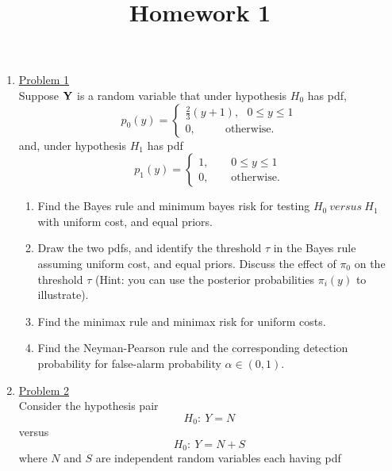 \documentclass[a4paper,english,10pt]{article}
\title{Homework 1}
\begin{document}
\maketitle
\begin{enumerate}
\item \hyperlink{solution1}{Problem 1}\\
Suppose ${\bf Y}$ is a random variable that under hypothesis $H_0$ has pdf,
\begin{equation*}\nonumber
	\nonumber
	p_0(y)=\begin{cases}
		\frac{2}{3}(y+1),~~~0\leq y\leq 1\\
		0,~~~~~~~~~~~~\mbox{otherwise.}
	\end{cases}
\end{equation*}
and, under hypothesis $H_1$ has pdf
\begin{equation*}\nonumber
	\nonumber
	p_1(y)=\begin{cases}
		1,~~~~~~~~~0\leq y\leq 1\\
		0,~~~~~~~~~\mbox{otherwise.}
	\end{cases}
\end{equation*}
\begin{enumerate}[label=(\alph*)]
	\item Find the Bayes rule and minimum bayes risk for testing $H_0~versus~H_1$ with uniform cost, and equal priors.
	\item Draw the two pdfs, and identify the threshold $\tau$ in the Bayes rule assuming uniform cost, and equal priors. Discuss the effect of $\pi_0$ on the threshold $\tau$ (Hint: you can use the posterior probabilities $\pi_i(y)$ to illustrate).	
	\item Find the minimax rule and minimax risk for uniform costs.
	\item Find the Neyman-Pearson rule and the corresponding detection probability for false-alarm probability $\alpha \in (0,1)$.		
\end{enumerate}
\item \hyperlink{solution2}{Problem 2}\\
Consider the hypothesis pair
\begin{equation*}\nonumber
	H_0:~Y=N
\end{equation*}
\hspace{120pt}versus
\begin{equation*}\nonumber
	H_0:~Y=N+S
\end{equation*}
where $N$ and $S$ are independent random variables each having pdf
\begin{equation*}\nonumber

\end{equation*}
\end{enumerate}
\end{document}
